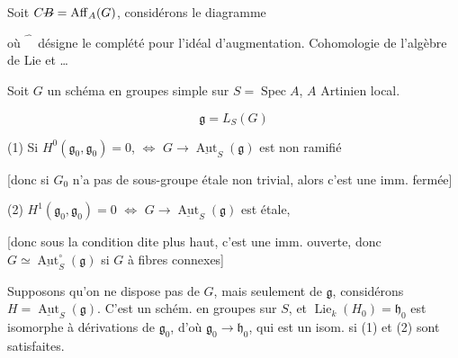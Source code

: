 Soit $C\deleted{B}=\operatorname{Aff}_A(G)$, considérons le diagramme


où $\widehat{\phantom C}$ désigne le  complété pour l'idéal d'augmentation.
Cohomologie de l'algèbre de Lie et    \ldots
{}

Soit \(G\) un schéma en groupes simple sur \(S=\operatorname{Spec} A\), \(A\) Artinien local.

\[
\mathfrak g=L_S(G)
\]

(1) Si \(H^0(\mathfrak g_0,\mathfrak g_0)=0\), \(\Longleftrightarrow\) \(G\longrightarrow\underline{\operatorname{Aut}}_S(\mathfrak g)\) est  non ramifié

[donc si \(G_0\) n'a pas de sous-groupe  étale  non trivial, alors c'est une imm. fermée]

(2)   \(H^1(\mathfrak g_0,\mathfrak g_0)=0\) \(\Longleftrightarrow\) \(G\longrightarrow\underline{\operatorname{Aut}}_S(\mathfrak g)\) est étale,

[donc sous la condition dite plus haut, c'est une imm. ouverte, donc \(G\simeq\underline{\operatorname{Aut}}_S^{\circ}(\mathfrak g)\) si \(G\) à fibres connexes]


Supposons qu'on ne dispose pas de \(G\), mais seulement de \(\mathfrak g\), considérons \(H=\underline{\operatorname{Aut}}_S(\mathfrak g)\).  C'est un schém. en groupes sur \(S\), et \(\operatorname{Lie}_k(H_0)=\mathfrak h_0\) est isomorphe à   dérivations de \(\mathfrak g_0\), d'où \(\mathfrak g_0\to\mathfrak h_0\), qui est un isom. si (1) et (2) sont satisfaites.

